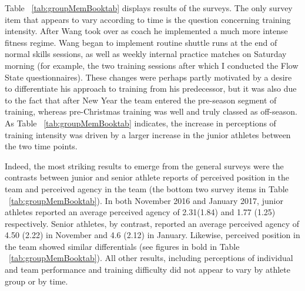 \begin{CJK}{UTF8}{gbsn}

  


Table ~\ref{tab:groupMemBooktab} displays results of the surveys.  The only survey item that appears to vary according to time is the question concerning training intensity.  After Wang took over as coach he implemented a much more intense fitness regime.  Wang began to implement routine shuttle runs at the end of normal skills sessions, as well as weekly internal practice matches on Saturday morning (for example, the two training sessions after which I conducted the Flow State questionnaires).  These changes were perhaps partly motivated by a desire to differentiate his approach to training from his predecessor, but it was also due to the fact that after New Year the team entered the pre-season segment of training, whereas pre-Christmas training was well and truly classed as off-season. As Table ~\ref{tab:groupMemBooktab} indicates, the increase in perceptions of training intensity was driven by a larger increase in the junior athletes between the two time points.

Indeed, the most striking results to emerge from the general surveys were the contrasts between junior and senior athlete reports of perceived position in the team and perceived agency in the team (the bottom two survey items in Table ~\ref{tab:groupMemBooktab}).  In both November 2016 and January 2017, junior athletes reported an average perceived agency of 2.31(1.84) and 1.77 (1.25) respectively. Senior athletes, by contrast, reported an average perceived agency of 4.50 (2.22) in November and 4.6 (2.12) in January.  Likewise, perceived position in the team showed similar differentials (see figures in bold in Table ~\ref{tab:groupMemBooktab}).  All other results, including perceptions of individual and team performance and training difficulty did not appear to vary by athlete group or by time.



\end{CJK}

